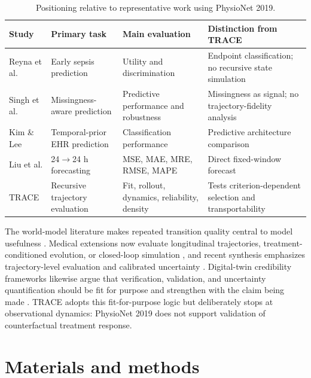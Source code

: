 \documentclass[preprint,12pt]{elsarticle}
\begin{document}
\begin{table}[ht]
\centering
\caption{Positioning relative to representative work using PhysioNet 2019.}
\label{tab:physionet_positioning}
\small
\begin{tabularx}{\textwidth}{p{2.3cm}p{2.8cm}p{2.8cm}X}
\toprule
Study & Primary task & Main evaluation & Distinction from TRACE \\
\midrule
Reyna et al. \cite{reyna2020sepsis} & Early sepsis prediction & Utility and discrimination & Endpoint classification; no recursive state simulation \\
Singh et al. \cite{singh2021missingness} & Missingness-aware prediction & Predictive performance and robustness & Missingness as signal; no trajectory-fidelity analysis \\
Kim \& Lee \cite{kim2024temporalprior} & Temporal-prior EHR prediction & Classification performance & Predictive architecture comparison \\
Liu et al. \cite{liu2026mtfpdg} & 24$\rightarrow$24 h forecasting & MSE, MAE, MRE, RMSE, MAPE & Direct fixed-window forecast \\
TRACE & Recursive trajectory evaluation & Fit, rollout, dynamics, reliability, density & Tests criterion-dependent selection and transportability \\
\bottomrule
\end{tabularx}
\end{table}

The world-model literature makes repeated transition quality central to model usefulness \cite{ha2018worldmodels,hafner2019planet}. Medical extensions now evaluate longitudinal trajectories, treatment-conditioned evolution, or closed-loop simulation \cite{makarov2025dtgpt,yang2025mewm,mu2026ehrworld,wang2026chronomedicalworld,wu2026sepsisagent}, and recent synthesis emphasizes trajectory-level evaluation and calibrated uncertainty \cite{liu2026medicalworldmodels}. Digital-twin credibility frameworks likewise argue that verification, validation, and uncertainty quantification should be fit for purpose and strengthen with the claim being made \cite{nasem2024digitaltwins,tudor2025hdt,sel2025vvuq,vallee2026trustworthy}. TRACE adopts this fit-for-purpose logic but deliberately stops at observational dynamics: PhysioNet 2019 does not support validation of counterfactual treatment response.

\section{Materials and methods}
\end{document}
